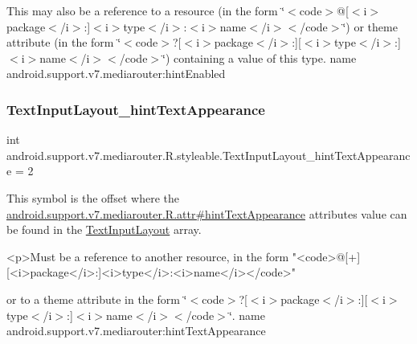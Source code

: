 This may also be a reference to a resource (in the form \char`\"{}$<$code$>$@\mbox{[}$<$i$>$package$<$/i$>$\+:\mbox{]}$<$i$>$type$<$/i$>$\+:$<$i$>$name$<$/i$>$$<$/code$>$\char`\"{}) or theme attribute (in the form \char`\"{}$<$code$>$?\mbox{[}$<$i$>$package$<$/i$>$\+:\mbox{]}\mbox{[}$<$i$>$type$<$/i$>$\+:\mbox{]}$<$i$>$name$<$/i$>$$<$/code$>$\char`\"{}) containing a value of this type.  name android.\+support.\+v7.\+mediarouter\+:hint\+Enabled \mbox{\label{classandroid_1_1support_1_1v7_1_1mediarouter_1_1R_1_1styleable_ab6a59dd02f3aa6519088694189ebef61}} 
\subsubsection{\texorpdfstring{Text\+Input\+Layout\+\_\+hint\+Text\+Appearance}{TextInputLayout\_hintTextAppearance}}
{\footnotesize\ttfamily int android.\+support.\+v7.\+mediarouter.\+R.\+styleable.\+Text\+Input\+Layout\+\_\+hint\+Text\+Appearance = 2\hspace{0.3cm}{\ttfamily [static]}}

This symbol is the offset where the \hyperlink{classandroid_1_1support_1_1v7_1_1mediarouter_1_1R_1_1attr_ac1d60bd46c49be81b781c430a18125ff}{android.\+support.\+v7.\+mediarouter.\+R.\+attr\#hint\+Text\+Appearance} attribute\textquotesingle{}s value can be found in the \hyperlink{classandroid_1_1support_1_1v7_1_1mediarouter_1_1R_1_1styleable_a935a5feb3f0394eb1c07f26b207dfb2d}{Text\+Input\+Layout} array.

\begin{DoxyVerb}      <p>Must be a reference to another resource, in the form "<code>@[+][<i>package</i>:]<i>type</i>:<i>name</i></code>"
\end{DoxyVerb}
 or to a theme attribute in the form \char`\"{}$<$code$>$?\mbox{[}$<$i$>$package$<$/i$>$\+:\mbox{]}\mbox{[}$<$i$>$type$<$/i$>$\+:\mbox{]}$<$i$>$name$<$/i$>$$<$/code$>$\char`\"{}.  name android.\+support.\+v7.\+mediarouter\+:hint\+Text\+Appearance \mbox{\label{classandroid_1_1support_1_1v7_1_1mediarouter_1_1R_1_1styleable_a6815cdfaadde30c82b955863af196899}} 
